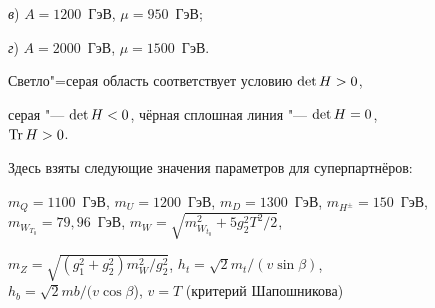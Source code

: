 \begin{figure}[b!]
{{\sl в}\/) $A=1200$~ГэВ, $\mu=950$~ГэВ; 

{\sl г}\/) $A=2000$~ГэВ, $\mu=1500$~ГэВ. 

Светло"=серая область соответствует условию $\mathop{\rm det} H>0$, 

серая "--- $\mathop{\rm det} H<0$, чёрная сплошная линия "--- $\mathop{\rm det} H=0$, $\mathop{\rm Tr} H>0$. 

Здесь взяты следующие значения параметров для суперпартнёров: 

$m_Q=1100$~ГэВ, $m_U=1200$~ГэВ, $m_D=1300$~ГэВ, $m_{H^\pm}=150$~ГэВ, $m_{W_{T_0}}=79,96$~ГэВ, $m_W=\sqrt{m_{W_{t_0}}^2+5 g_2^2 T^2/2}$, 

$m_Z=\sqrt{(g_1^2+g_2^2) m_W^2/g_2^2}$, $h_t={\sqrt{2} m_t}/({v \sin \beta})$, $h_b={\sqrt{2} mb}/({v \cos \beta}$), $v=T$ (критерий Шапошникова)}


\label{dolg:ris:bs}



\vspace{-3mm}



\end{figure}



